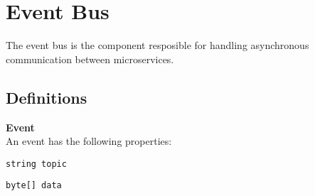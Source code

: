 \chapter{Event Bus}
The event bus is the component resposible for handling asynchronous communication between microservices.

\section{Definitions}
\begin{teitemize}
    \item \textbf{Event}\\
    An event has the following properties:
    \begin{teitemize}
        \item \texttt{string topic}
        \item \texttt{byte[] data}
    \end{teitemize}
\end{teitemize}